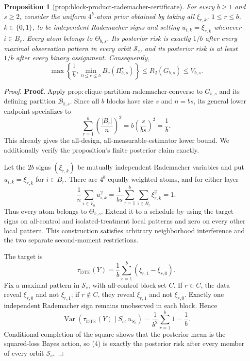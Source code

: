 \documentclass{article}
\newtheorem{proposition}{Proposition}
\begin{document}
\begin{proposition}[prop:block-product-rademacher-certificate]\label{prop:block-product-rademacher-certificate}
For every \(b\geq 1\) and \(s\geq 2\), consider the uniform \(4^b\)-atom prior obtained by taking all \(\xi_{r,k}\), \(1\leq r\leq b\), \(k\in\{0,1\}\), to be independent Rademacher signs and setting \(u_{i,k}=\xi_{r,k}\) whenever \(i\in B_r\). Every atom belongs to \(\Theta_{b,s}\). Its posterior risk is exactly \(1/b\) after every maximal observation pattern in every orbit \(\mathcal S_c\), and its posterior risk is at least \(1/b\) after every binary assignment. Consequently,
\[
\max\left\{\frac1b,\min_{0\leq c\leq b}B_c(\Pi_{b,s}^{\star})\right\}
\leq R_2(G_{b,s})\leq V_{b,s}.
\]
\end{proposition}
\begin{proof}
\textbf{Proof.}
Apply \(\mathrm{prop{:}clique\text{-}partition\text{-}rademacher\text{-}converse}\) to \(G_{b,s}\) and its defining partition \(\mathcal B_{b,s}\). Since all \(b\) blocks have size \(s\) and \(n=bs\), its general lower endpoint specializes to
\[
\sum_{r=1}^b\left(\frac{|B_r|}{n}\right)^2
=b\left(\frac{s}{bs}\right)^2=\frac1b.
\tag{1}
\]
This already gives the all-design, all-measurable-estimator lower bound. We additionally verify the proposition's finite posterior claim exactly.

Let the \(2b\) signs \((\xi_{r,k})\) be mutually independent Rademacher variables and put \(u_{i,k}=\xi_{r,k}\) for \(i\in B_r\). There are \(4^b\) equally weighted atoms, and for either layer
\[
\frac1n\sum_{i\in V_n}u_{i,k}^2
=\frac1{bs}\sum_{r=1}^b\sum_{i\in B_r}\xi_{r,k}^2=1.
\tag{2}
\]
Thus every atom belongs to \(\Theta_{b,s}\). Extend it to a schedule by using the target signs on all-control and isolated-treatment local patterns and zero on every other local pattern. This construction satisfies arbitrary neighborhood interference and the two separate second-moment restrictions.

The target is
\[
\tau_{\mathrm{DTE}}(Y)=\frac1b\sum_{r=1}^b(\xi_{r,1}-\xi_{r,0}).
\tag{3}
\]
Fix a maximal pattern in \(\mathcal S_c\), with all-control block set \(C\). If \(r\in C\), the data reveal \(\xi_{r,0}\) and not \(\xi_{r,1}\); if \(r\notin C\), they reveal \(\xi_{r,1}\) and not \(\xi_{r,0}\). Exactly one independent Rademacher sign remains unobserved in each block. Hence
\[
\operatorname{Var}\!\left(\tau_{\mathrm{DTE}}(Y)\mid S_c,u_{S_c}\right)
=\frac1{b^2}\sum_{r=1}^b1=\frac1b.
\tag{4}
\]
Conditional completion of the square shows that the posterior mean is the squared-loss Bayes action, so (4) is exactly the posterior risk after every member of every orbit \(\mathcal S_c\).


\end{proof}
\end{document}
